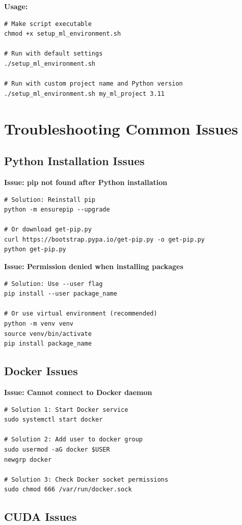 \textbf{Usage:}
\begin{lstlisting}[style=shell]
# Make script executable
chmod +x setup_ml_environment.sh

# Run with default settings
./setup_ml_environment.sh

# Run with custom project name and Python version
./setup_ml_environment.sh my_ml_project 3.11
\end{lstlisting}

\section{Troubleshooting Common Issues}

\subsection{Python Installation Issues}

\textbf{Issue: pip not found after Python installation}
\begin{lstlisting}[style=shell]
# Solution: Reinstall pip
python -m ensurepip --upgrade

# Or download get-pip.py
curl https://bootstrap.pypa.io/get-pip.py -o get-pip.py
python get-pip.py
\end{lstlisting}

\textbf{Issue: Permission denied when installing packages}
\begin{lstlisting}[style=shell]
# Solution: Use --user flag
pip install --user package_name

# Or use virtual environment (recommended)
python -m venv venv
source venv/bin/activate
pip install package_name
\end{lstlisting}

\subsection{Docker Issues}

\textbf{Issue: Cannot connect to Docker daemon}
\begin{lstlisting}[style=shell]
# Solution 1: Start Docker service
sudo systemctl start docker

# Solution 2: Add user to docker group
sudo usermod -aG docker $USER
newgrp docker

# Solution 3: Check Docker socket permissions
sudo chmod 666 /var/run/docker.sock
\end{lstlisting}

\subsection{CUDA Issues}

